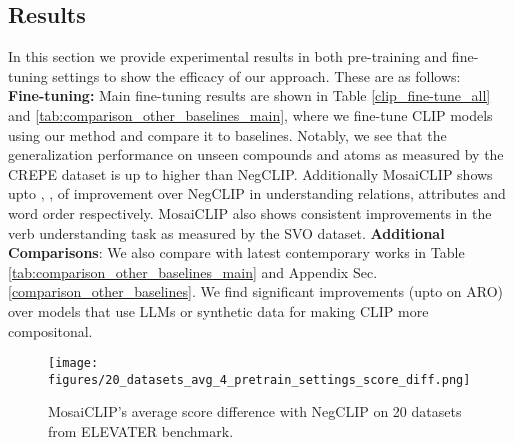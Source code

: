 \documentclass[11pt]{article}
\newcommand{\methodcomp}{MosaiCLIP}
\newcommand{\negclip}{NegCLIP}
\begin{document}
\subsection{Results}
\label{results}
In this section we provide experimental results in both pre-training and fine-tuning settings to show the efficacy of our approach. These are as follows:\\
\newline
\noindent \textbf{Fine-tuning:} Main fine-tuning results are shown in Table \ref{clip_fine-tune_all} and \ref{tab:comparison_other_baselines_main}, where we fine-tune CLIP models using our method and compare it to baselines. Notably, we see that the generalization performance on unseen compounds and atoms as measured by the CREPE dataset is up to {} higher than NegCLIP. Additionally \methodcomp{} shows upto {, , } of improvement over \negclip{} in understanding relations, attributes and word order respectively. \methodcomp{} also shows consistent improvements in the verb understanding task as measured by the SVO dataset. \textbf{Additional Comparisons}: We also compare with latest contemporary works in Table \ref{tab:comparison_other_baselines_main} and Appendix Sec. \ref{comparison_other_baselines}. We find significant improvements (upto  on ARO) over models that use LLMs or synthetic data for making CLIP more compositonal.\\
    
\begin{figure}[h!]
    \centering
    \texttt{[image: figures/20\_datasets\_avg\_4\_pretrain\_settings\_score\_diff.png]}
    \caption{\methodcomp{}'s average score difference with \negclip{} on 20 datasets from {\color{blue} ELEVATER} benchmark.}
    \label{fig:20_datasets_avg_all_pretraining}
    \vspace{-0.5cm}
\end{figure}
    
\end{document}

